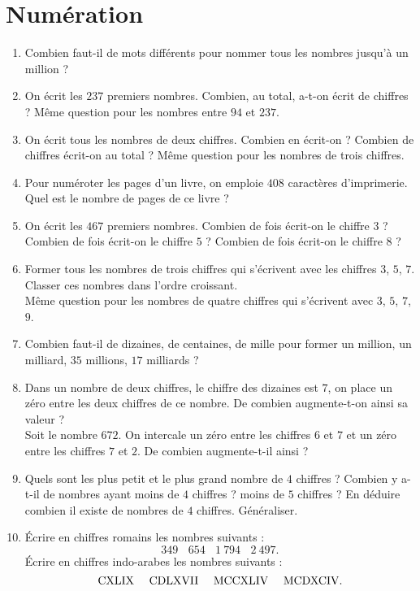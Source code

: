\chapter{Numération}
 
 \begin{enumerate}
 \item Combien faut-il de mots différents pour nommer tous les nombres jusqu'à un million ? 
 \item On écrit les $237$ premiers nombres. Combien, au total, a-t-on écrit de chiffres ? Même question pour les nombres entre $94$ et $237$. 
 \item On écrit tous les nombres de deux chiffres. Combien en écrit-on ? 
 Combien de chiffres écrit-on au total ? Même question pour les nombres de trois chiffres. 
 \item Pour numéroter les pages d'un livre, on emploie $408$ caractères d'imprimerie. Quel est le nombre de pages de ce livre ?
 \item On écrit les $467$ premiers nombres. Combien de fois écrit-on le chiffre $3$ ? Combien de fois écrit-on le chiffre $5$ ? Combien de fois écrit-on le chiffre $8$ ? 
 \item Former tous les nombres de trois chiffres qui s'écrivent avec les chiffres $3$, $5$, $7$. Classer ces nombres dans l'ordre croissant.\\
 Même question pour les nombres de quatre chiffres qui s'écrivent avec $3$, $5$, $7$, $9$. 
 \item Combien faut-il de dizaines, de centaines, de mille pour former un million, un milliard, $35$ millions, $17$ milliards ?
 \item Dans un nombre de deux chiffres, le chiffre des dizaines est $7$, on place un zéro entre les deux chiffres de ce nombre. De combien augmente-t-on ainsi sa valeur ? \\
 Soit le nombre $672$. On intercale un zéro entre les chiffres $6$ et $7$ et un zéro entre les chiffres $7$ et $2$. De combien augmente-t-il ainsi ? 
 \item Quels sont les plus petit et le plus grand nombre de $4$ chiffres ? Combien y a-t-il de nombres ayant moins de $4$ chiffres ? moins de $5$ chiffres ? En déduire combien il existe de nombres de $4$ chiffres. Généraliser. 
 \item Écrire en chiffres romains les nombres suivants : 
 \[ 349 \ \ \ \ 654 \ \ \ \ 1\ 794 \ \ \ \ 2\ 497. \]
 Écrire en chiffres indo-arabes les nombres suivants : 
 \[ \rm CXLIX \ \ \ \ CDLXVII \ \ \ \ MCCXLIV \ \ \ \ MCDXCIV. \]
 

\end{enumerate}
